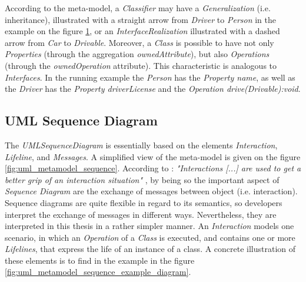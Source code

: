 \documentclass[tuberlin,cic,tc,english,noabntcite]{iiufrgs}
\begin{document}
\begin{figure}[h]
\begin{subfigure}[h]{.64\textwidth}
	\end{subfigure}
    \label{fig:uml_metamodel_class_example}
\end{figure}

According to the meta-model, a \emph{Classifier} may have a \emph{Generalization} (i.e. inheritance), illustrated with a straight arrow from \emph{Driver} to \emph{Person} in the example on the figure \ref{fig:uml_metamodel_class_example}, or an \emph{InterfaceRealization}  illustrated with a dashed arrow from \emph{Car} to \emph{Drivable}. Moreover, a \emph{Class} is possible to have not only \emph{Properties} (through the aggregation \emph{ownedAttribute}), but also \emph{Operations} (through the \emph{ownedOperation} attribute). This characteristic is analogous to \emph{Interfaces}. In the running example the \emph{Person} has the \emph{Property name}, as well as the \emph{Driver} has the \emph{Property driverLicense} and the \emph{Operation drive(Drivable):void}. 

\subsection{UML Sequence Diagram}
The \emph{UMLSequenceDiagram} is essentially based on the elements \emph{Interaction}, \emph{Lifeline}, and \emph{Messages}. A simplified view of the meta-model is given on the figure \ref{fig:uml_metamodel_sequence}. According to \citet[p. 563]{omg2007unified}: \emph{"Interactions [...] are used to get a better grip of an interaction situation"} \citep[p. 563]{omg2007unified}, by being so the important aspect of \emph{Sequence Diagram} are the exchange of messages between object (i.e. interaction). Sequence diagrams are quite flexible in regard to its semantics, so developers interpret the exchange of messages in different ways. Nevertheless, they are interpreted in this thesis in a rather simpler manner. An \emph{Interaction} models one scenario, in which an \emph{Operation} of a \emph{Class} is executed, and contains one or more \emph{Lifelines}, that express the life of an instance of a class. A concrete illustration of these elements is to find in the example in the figure \ref{fig:uml_metamodel_sequence_example_diagram}.
\end{document}
